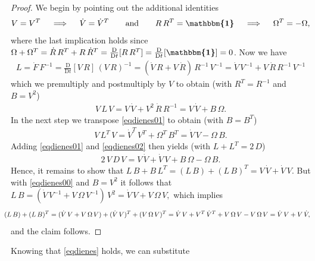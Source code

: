 \documentclass[10pt]{article}
\numberwithin{theoremCounter}{section}
\theoremstyle{plain}
\theoremstyle{definition}
\newcommand{\id}{{\boldsymbol{\mathbbm{1}}}}
\newcommand{\DD}{\mathrm{D}}
\numberwithin{equation}{section}
\begin{document}
	\begin{proof}
	We begin by pointing out the additional identities
		\begin{align}
		V = V^T \quad \implies \quad \dot{V} = \dot{V}^T \qquad \textnormal{and} \qquad R \, R^T = \id \quad \implies \quad \Omega^T = - \Omega,
		\end{align}
	where the last implication holds since $\Omega + \Omega^T = \dot{R} \, R^T + R \, \dot{R}^T = \frac{\DD}{\DD t}[R \, R^T] = \frac{\DD}{\DD t}[\id] = 0$.
	Now we have
		\begin{align}
		\label{eqdienes00}
		L = \dot{F} \, F^{-1} = \frac{\DD}{\DD t}[V \, R] \, (V \, R)^{-1} = (\dot{V} \, R + V \, \dot{R})\, R^{-1} \, V^{-1} = \dot{V} \, V^{-1} + V \, \dot{R} \, R^{-1} \, V^{-1}
		\end{align}
	which we premultiply and postmultiply by $V$ to obtain (with $R^T = R^{-1}$ and $B = V^2$)
		\begin{align}
		\label{eqdienes01}
		V \, L \, V = V \, \dot{V} + V^2 \, \dot{R} \, R^{-1} = V \, \dot{V} + B \, \Omega.
		\end{align}
	In the next step we transpose \eqref{eqdienes01} to obtain (with $B = B^T$)
		\begin{align}
		\label{eqdienes02}
		V \, L^T \, V = \dot{V}^T \, V^T + \Omega^T \, B^T = \dot{V} \, V - \Omega \, B.
		\end{align}
	Adding \eqref{eqdienes01} and \eqref{eqdienes02} then yields (with $L + L^T = 2 \, D$)
		\begin{align}
		2 \, V \, D \, V = V \, \dot{V} + \dot{V} \, V + B \, \Omega - \Omega \, B.
		\end{align}
	Hence, it remains to show that
		$
		L \, B + B \, L^T = (L\, B) + (L \, B)^T = V \, \dot{V} + \dot{V} \, V.
		$
	But with \eqref{eqdienes00} and $B = V^2$ it follows that
		$
		L \, B = (\dot{V} \, V^{-1} + V \, \Omega \, V^{-1}) \, V^2 = \dot{V} \, V + V \, \Omega \, V,
		$
	which implies
		\begin{equation}
		\begin{alignedat}{2}
		\hspace*{-10pt} (L \, B) + (L \, B)^T &= (\dot{V} \, V + V \, \Omega \, V) + (\dot{V} \, V)^T + (V \, \Omega \, V)^T = \dot{V} \, V + V^T \, \dot{V}^T + V \, \Omega \, V - V \, \Omega \, V = \dot{V} \, V + V \, \dot{V},
		\end{alignedat}
		\end{equation}
	and the claim follows. 
	\end{proof}
%
\noindent Knowing that \eqref{eqdienes} holds, we can substitute
\end{document}
